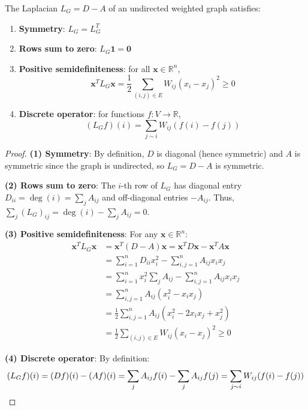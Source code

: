 \begin{proposition}\label{prop:propiedades_algebraicas_laplaciano}
	The Laplacian $L_G = D - A$ of an undirected weighted graph satisfies:
	\begin{enumerate}
		\item \textbf{Symmetry}: $L_G = L_G^T$
		\item \textbf{Rows sum to zero}: $L_G \mathbf{1} = \mathbf{0}$
		\item \textbf{Positive semidefiniteness}: for all $\mathbf{x} \in \mathbb{R}^n$,
		\[
			\mathbf{x}^T L_G \mathbf{x} = \frac{1}{2}\sum_{(i,j)\in E} W_{ij}(x_i - x_j)^2 \geq 0
		\]
		\item \textbf{Discrete operator}: for functions $f: V \to \mathbb{R}$,
		\[
			(L_G f)(i) = \sum_{j\sim i} W_{ij}(f(i)-f(j))
		\]
	\end{enumerate}
\end{proposition}

\begin{proof}
	\textbf{(1) Symmetry}: By definition, $D$ is diagonal (hence symmetric) and $A$ is symmetric since the graph is undirected, so $L_G = D - A$ is symmetric.

	\textbf{(2) Rows sum to zero}: The $i$-th row of $L_G$ has diagonal entry $D_{ii} = \deg(i) = \sum_j A_{ij}$ and off-diagonal entries $-A_{ij}$. Thus, $\sum_j (L_G)_{ij} = \deg(i) - \sum_j A_{ij} = 0$.

	\textbf{(3) Positive semidefiniteness}: For any $\mathbf{x} \in \mathbb{R}^n$:
	\begin{align}
		\mathbf{x}^T L_G \mathbf{x} &= \mathbf{x}^T (D - A) \mathbf{x} = \mathbf{x}^T D \mathbf{x} - \mathbf{x}^T A \mathbf{x}\\
		&= \sum_{i=1}^n D_{ii} x_i^2 - \sum_{i,j=1}^n A_{ij} x_i x_j\\
		&= \sum_{i=1}^n x_i^2 \sum_{j} A_{ij} - \sum_{i,j=1}^n A_{ij} x_i x_j\\
		&= \sum_{i,j=1}^n A_{ij} (x_i^2 - x_i x_j)\\
		&= \frac{1}{2} \sum_{i,j=1}^n A_{ij} (x_i^2 - 2x_i x_j + x_j^2)\\
		&= \frac{1}{2} \sum_{(i,j) \in E} W_{ij} (x_i - x_j)^2 \geq 0
	\end{align}

	\textbf{(4) Discrete operator}: By definition:
	\[
		(L_G f)(i) = (Df)(i) - (Af)(i) = \sum_{j} A_{ij} f(i) - \sum_{j} A_{ij} f(j) = \sum_{j \sim i} W_{ij}(f(i) - f(j)) \qedhere
	\]
\end{proof}


